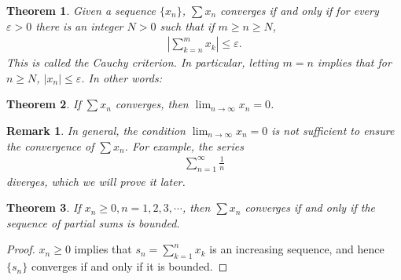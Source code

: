 \documentclass[11pt]{book}
\newtheorem{theorem}{Theorem}[chapter]
\newtheorem{remark}{Remark}[chapter]
\theoremstyle{definition}
\numberwithin{equation}{chapter}
\begin{document}
\medskip

\begin{theorem}
Given a sequence $\{x_n\}$, $\sum x_n$ converges if and only if for every $\varepsilon > 0$ there is an integer $N > 0$ such that if $m \geq n \geq N$,
\begin{align*}
    \left|\sum^m_{k=n} x_k\right| \leq \varepsilon.
\end{align*}
This is called the Cauchy criterion. In particular, letting $m = n$ implies that for $n \geq N$, $\left|x_n\right| \leq \varepsilon$. In other words:
\end{theorem}

\medskip

\begin{theorem}\label{th_218}
If $\sum x_n$ converges, then $\lim_{n\to\infty} x_n = 0$.
\end{theorem}

\medskip

\begin{remark}
In general, the condition $\lim_{n\to\infty} x_n = 0$ is not sufficient to ensure the convergence of $\sum x_n$. For example, the series
\begin{align*}
    \sum^\infty_{n=1} \frac{1}{n}
\end{align*}
diverges, which we will prove it later. 
\end{remark}

\medskip

\begin{theorem}\label{th_219}
If $x_n \geq 0, n = 1,2,3,\cdots$, then $\sum x_n$ converges if and only if the sequence of partial sums is bounded. 
\end{theorem}
\begin{proof}
$x_n \geq 0$ implies that $s_n = \sum^n_{k=1} x_k$ is an increasing sequence, and hence $\{s_n\}$ converges if and only if it is bounded.
\end{proof}

\medskip
\end{document}
